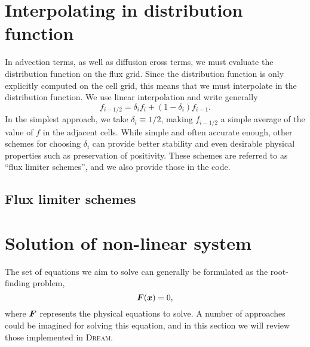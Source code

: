 \documentclass{notes}
\newcommand{\DREAM}{\textsc{Dream}}
\begin{document}
    \section{Interpolating in distribution function}\label{sec:interp}
    In advection terms, as well as diffusion cross terms, we must evaluate the
    distribution function on the flux grid. Since the distribution function is
    only explicitly computed on the cell grid, this means that we must
    interpolate in the distribution function. We use linear interpolation and
    write generally
    \begin{equation}
        f_{i-1/2} = \delta_{i} f_i + \left( 1 - \delta_i \right) f_{i-1}.
    \end{equation}
    In the simplest approach, we take $\delta_i\equiv 1/2$, making $f_{i-1/2}$
    a simple average of the value of $f$ in the adjacent cells. While simple and
    often accurate enough, other schemes for choosing $\delta_i$ can provide
    better stability and even desirable physical properties such as preservation
    of positivity. These schemes are referred to as ``flux limiter schemes'',
    and we also provide those in the code.

    \subsection{Flux limiter schemes}

    \section{Solution of non-linear system}
    The set of equations we aim to solve can generally be formulated as the
    root-finding problem,
    \begin{equation}\label{eq:nonlinear}
        \boldsymbol{F}(\boldsymbol{x}) = 0,
    \end{equation}
    where $\boldsymbol{F}$ represents the physical equations to solve. A number of
    approaches could be imagined for solving this equation, and in this section
    we will review those implemented in \DREAM.
\end{document}
